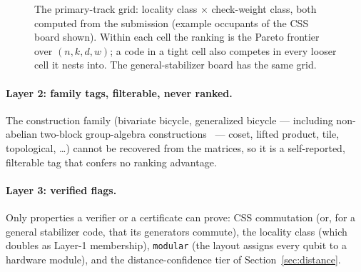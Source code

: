 \documentclass[11pt]{article}
\begin{document}
	\begin{figure}[h]
	\centering
	\caption{The primary-track grid: locality class $\times$ check-weight
	class, both computed from the submission (example occupants of the CSS
	board shown). Within each cell the ranking is the Pareto frontier over
	$(n,k,d,w)$; a code in a tight cell also competes in every looser cell
	it nests into. The general-stabilizer board has the same grid.}
	\label{fig:grid}
	\end{figure}

	\paragraph{Layer 2: family tags, filterable, never ranked.} The
	construction family (bivariate bicycle, generalized bicycle --- including
	non-abelian two-block group-algebra
	constructions~\cite{lin2024quantum} --- coset, lifted product, tile,
	topological, \dots) cannot be recovered from the matrices, so it is a
	self-reported, filterable tag that confers no ranking advantage.

	\paragraph{Layer 3: verified flags.} Only properties a verifier or a
	certificate can prove: CSS commutation (or, for a general stabilizer
	code, that its generators commute), the locality class (which doubles
	as Layer-1 membership), \texttt{modular} (the layout assigns every qubit
	to a hardware module), and the distance-confidence tier of
	Section~\ref{sec:distance}.
\end{document}
